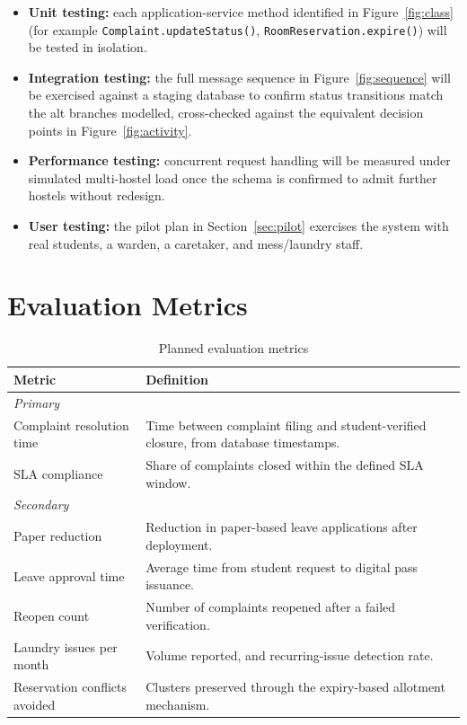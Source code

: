 \documentclass{tietreport}
\begin{document}
\begin{itemize}
  \item \textbf{Unit testing:} each application-service method identified
    in Figure~\ref{fig:class} (for example \texttt{Complaint.updateStatus()},
    \texttt{RoomReservation.expire()}) will be tested in isolation.
  \item \textbf{Integration testing:} the full message sequence in
    Figure~\ref{fig:sequence} will be exercised against a staging
    database to confirm status transitions match the alt branches
    modelled, cross-checked against the equivalent decision points in
    Figure~\ref{fig:activity}.
  \item \textbf{Performance testing:} concurrent request handling will be
    measured under simulated multi-hostel load once the schema is
    confirmed to admit further hostels without redesign.
  \item \textbf{User testing:} the pilot plan in
    Section~\ref{sec:pilot} exercises the system with real students,
    a warden, a caretaker, and mess/laundry staff.
\end{itemize}

\section{Evaluation Metrics}
\label{sec:metrics}

\begin{table}[h]
\centering
\begin{tabular}{|p{3.6cm}|p{9.6cm}|}
  \hline
  \textbf{Metric} & \textbf{Definition} \\
  \hline
  \multicolumn{2}{|l|}{\textit{Primary}} \\
  \hline
  Complaint resolution time & Time between complaint filing and
    student-verified closure, from database timestamps. \\
  \hline
  SLA compliance & Share of complaints closed within the defined SLA
    window. \\
  \hline
  \multicolumn{2}{|l|}{\textit{Secondary}} \\
  \hline
  Paper reduction & Reduction in paper-based leave applications after
    deployment. \\
  \hline
  Leave approval time & Average time from student request to digital
    pass issuance. \\
  \hline
  Reopen count & Number of complaints reopened after a failed
    verification. \\
  \hline
  Laundry issues per month & Volume reported, and recurring-issue
    detection rate. \\
  \hline
  Reservation conflicts avoided & Clusters preserved through the
    expiry-based allotment mechanism. \\
  \hline
\end{tabular}
\caption{Planned evaluation metrics}
\label{tab:metrics}
\end{table}
\end{document}
